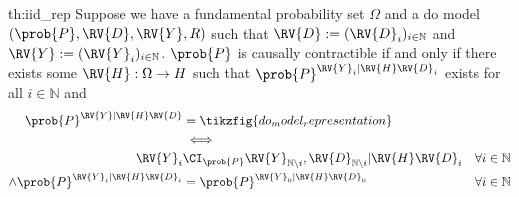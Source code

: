 \begin{reptheorem}{th:iid_rep}
Suppose we have a fundamental probability set $\Omega$ and a do model $(\prob{P},\RV{D},\RV{Y},R)$ such that $\RV{D}:=(\RV{D}_i)_{i\in \mathbb{N}}$ and $\RV{Y}:=(\RV{Y}_i)_{i\in\mathbb{N}}$. $\prob{P}$ is causally contractible if and only if there exists some $\RV{H}:\Omega\to H$ such that $\prob{P}^{\RV{Y}_i|\RV{H}\RV{D}_i}$ exists for all $i\in \mathbb{N}$ and
\begin{align}
    \prob{P}^{\RV{Y}|\RV{H}\RV{D}} &= \tikzfig{do_model_representation}\\
    &\iff\\
    \RV{Y}_i&\CI_{\prob{P}} \RV{Y}_{\mathbb{N}\setminus i},\RV{D}_{\mathbb{N}\setminus i}|\RV{H}\RV{D}_i&\forall i\in \mathbb{N}\\
    \land \prob{P}^{\RV{Y}_i|\RV{H}\RV{D}_i} &= \prob{P}^{\RV{Y}_0|\RV{H}\RV{D}_0} & \forall i\in \mathbb{N}
\end{align}
\end{reptheorem}

